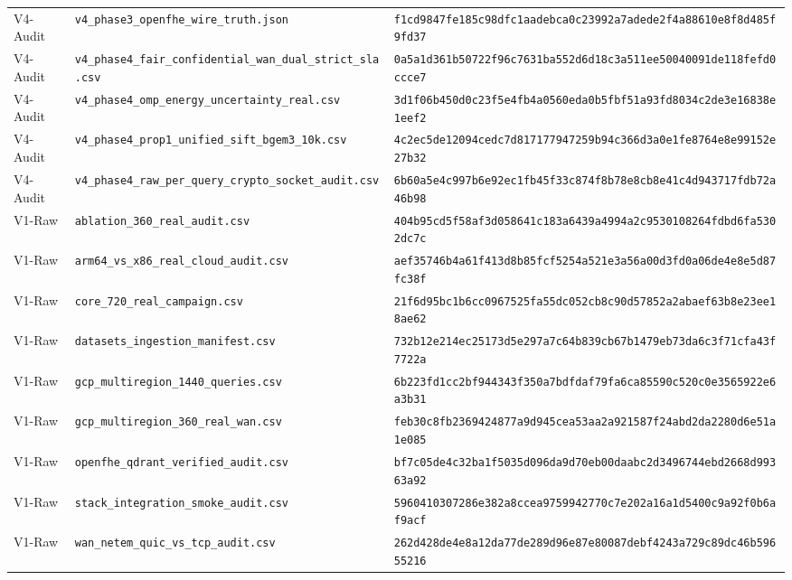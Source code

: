 \documentclass[10pt,journal,compsoc]{IEEEtran}
\begin{document}
\begin{table}[!t]
\begin{adjustbox}{max width=\textwidth}
\begin{tabular}{@{}lll@{}}
V4-Audit & \texttt{v4\_phase3\_openfhe\_wire\_truth.json} & \texttt{\scriptsize f1cd9847fe185c98dfc1aadebca0c23992a7adede2f4a88610e8f8d485f9fd37} \\
V4-Audit & \texttt{v4\_phase4\_fair\_confidential\_wan\_dual\_strict\_sla.csv} & \texttt{\scriptsize 0a5a1d361b50722f96c7631ba552d6d18c3a511ee50040091de118fefd0ccce7} \\
V4-Audit & \texttt{v4\_phase4\_omp\_energy\_uncertainty\_real.csv} & \texttt{\scriptsize 3d1f06b450d0c23f5e4fb4a0560eda0b5fbf51a93fd8034c2de3e16838e1eef2} \\
V4-Audit & \texttt{v4\_phase4\_prop1\_unified\_sift\_bgem3\_10k.csv} & \texttt{\scriptsize 4c2ec5de12094cedc7d817177947259b94c366d3a0e1fe8764e8e99152e27b32} \\
V4-Audit & \texttt{v4\_phase4\_raw\_per\_query\_crypto\_socket\_audit.csv} & \texttt{\scriptsize 6b60a5e4c997b6e92ec1fb45f33c874f8b78e8cb8e41c4d943717fdb72a46b98} \\
V1-Raw & \texttt{ablation\_360\_real\_audit.csv} & \texttt{\scriptsize 404b95cd5f58af3d058641c183a6439a4994a2c9530108264fdbd6fa5302dc7c} \\
V1-Raw & \texttt{arm64\_vs\_x86\_real\_cloud\_audit.csv} & \texttt{\scriptsize aef35746b4a61f413d8b85fcf5254a521e3a56a00d3fd0a06de4e8e5d87fc38f} \\
V1-Raw & \texttt{core\_720\_real\_campaign.csv} & \texttt{\scriptsize 21f6d95bc1b6cc0967525fa55dc052cb8c90d57852a2abaef63b8e23ee18ae62} \\
V1-Raw & \texttt{datasets\_ingestion\_manifest.csv} & \texttt{\scriptsize 732b12e214ec25173d5e297a7c64b839cb67b1479eb73da6c3f71cfa43f7722a} \\
V1-Raw & \texttt{gcp\_multiregion\_1440\_queries.csv} & \texttt{\scriptsize 6b223fd1cc2bf944343f350a7bdfdaf79fa6ca85590c520c0e3565922e6a3b31} \\
V1-Raw & \texttt{gcp\_multiregion\_360\_real\_wan.csv} & \texttt{\scriptsize feb30c8fb2369424877a9d945cea53aa2a921587f24abd2da2280d6e51a1e085} \\
V1-Raw & \texttt{openfhe\_qdrant\_verified\_audit.csv} & \texttt{\scriptsize bf7c05de4c32ba1f5035d096da9d70eb00daabc2d3496744ebd2668d99363a92} \\
V1-Raw & \texttt{stack\_integration\_smoke\_audit.csv} & \texttt{\scriptsize 5960410307286e382a8ccea9759942770c7e202a16a1d5400c9a92f0b6af9acf} \\
V1-Raw & \texttt{wan\_netem\_quic\_vs\_tcp\_audit.csv} & \texttt{\scriptsize 262d428de4e8a12da77de289d96e87e80087debf4243a729c89dc46b59655216} \\

\end{tabular}
\end{adjustbox}
\end{table}
\end{document}

